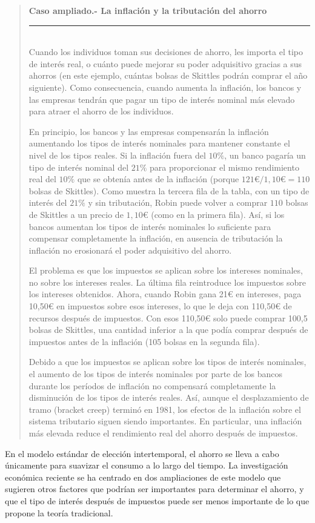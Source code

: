 \documentclass[10pt,a4paper]{article}
\newenvironment{specialblock}[1]{%
      \begin{quote} %
      \small %
      \noindent\textbf{#1}\\[-0.3em] %
      \rule{\linewidth}{0.4pt}\\[0.6em]}{
      \end{quote}}
\begin{document}
\begin{specialblock}{\textbf{Caso ampliado.-} La inflación y la tributación del ahorro}
    Cuando los individuos toman sus decisiones de ahorro, les importa el tipo de interés real, o cuánto puede mejorar su poder adquisitivo gracias a sus ahorros (en este ejemplo, cuántas bolsas de Skittles podrán comprar el año siguiente). Como consecuencia, cuando aumenta la inflación, los bancos y las empresas tendrán que pagar un tipo de interés nominal más elevado para atraer el ahorro de los individuos.
    
    En principio, los bancos y las empresas compensarán la inflación aumentando los tipos de interés nominales para mantener constante el nivel de los tipos reales. Si la inflación fuera del $10\%$, un banco pagaría un tipo de interés nominal del $21\%$ para proporcionar el mismo rendimiento real del $10\%$ que se obtenía antes de la inflación (porque $121€/1,10€ = 110$ bolsas de Skittles). Como muestra la tercera fila de la tabla, con un tipo de interés del $21\%$ y sin tributación, Robin puede volver a comprar $110$ bolsas de Skittles a un precio de $1,10€$ (como en la primera fila). Así, si los bancos aumentan los tipos de interés nominales lo suficiente para compensar completamente la inflación, en ausencia de tributación la inflación no erosionará el poder adquisitivo del ahorro.
    
    El problema es que los impuestos se aplican sobre los intereses nominales, no sobre los intereses reales. La última fila reintroduce los impuestos sobre los intereses obtenidos. Ahora, cuando Robin gana 21€ en intereses, paga 10,50€ en impuestos sobre esos intereses, lo que le deja con 110,50€ de recursos después de impuestos. Con esos 110,50€ solo puede comprar 100,5 bolsas de Skittles, una cantidad inferior a la que podía comprar después de impuestos antes de la inflación (105 bolsas en la segunda fila).
    
    Debido a que los impuestos se aplican sobre los tipos de interés nominales, el aumento de los tipos de interés nominales por parte de los bancos durante los períodos de inflación no compensará completamente la disminución de los tipos de interés reales. Así, aunque el desplazamiento de tramo (bracket creep) terminó en 1981, los efectos de la inflación sobre el sistema tributario siguen siendo importantes. En particular, una inflación más elevada reduce el rendimiento real del ahorro después de impuestos.
\end{specialblock}


En el modelo estándar de elección intertemporal, el ahorro se lleva a cabo únicamente para suavizar el consumo a lo largo del tiempo. La investigación económica reciente se ha centrado en dos ampliaciones de este modelo que sugieren otros factores que podrían ser importantes para determinar el ahorro, y que el tipo de interés después de impuestos puede ser menos importante de lo que propone la teoría tradicional.
\end{document}
